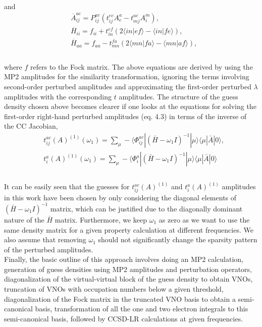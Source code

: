\\
and %
\begin{equation}
\begin{split}
& \overbar{A}^{ac}_{ij} = P_{ij}^{ac}(t^{ec}_{ij}A^a_e - t^{ac}_{mj}A^m_i) ,\\
& \overbar{H}_{ii} =  f_{ii} + t^{ef}_{in}(2 \langle in|ef \rangle - \langle in|fe \rangle),\\
& \overbar{H}_{aa} =  f_{aa} - t^{fa}_{mn}(2 \langle mn|fa \rangle - \langle mn|af \rangle), \\
\end{split}
\end{equation}
\\
where $f$ refers to the Fock matrix. The above equations are derived by 
using the MP2 amplitudes for the similarity transformation, ignoring the terms 
involving second-order perturbed amplitudes and approximating the first-order 
perturbed $\lambda$ amplitudes with the corresponding $t$ amplitudes. 
The structure of the guess density chosen above becomes clearer 
if one looks at the equations for solving the first-order right-hand perturbed amplitudes 
(eq. 4.3) in terms of the inverse of the CC Jacobian,
\\
\begin{equation}
\begin{split}
& t^{ac}_{ij}(A)^{(1)}(\omega_1) = \sum_\mu - \langle\Phi_{ij}^{ac}| {(\bar{H} -\omega_1 I)}^{-1} |
\mu\rangle\langle \mu| \bar{A} | 0\rangle, \\
& t^{a}_{i}(A)^{(1)}(\omega_1) = \sum_\mu -\langle\Phi_{i}^{a}| {(\bar{H} -\omega_1 I)}^{-1} |
\mu\rangle \langle \mu| \bar{A} | 0\rangle \\
\end{split}
\end{equation}
\\
It can be easily seen that the guesses for $t^{ac}_{ij}(A)^{(1)}$ and 
$t^{a}_{i}(A)^{(1)}$ amplitudes in this work have been chosen by 
only considering the diagonal elements of $(\bar{H} -\omega_1 I)^{-1}$
matrix, which can be justified due to the diagonally dominant nature of the
$\bar{H}$ matrix. Furthermore, we keep $\omega_1$ as zero as we 
want to use the same density matrix for a given property calculation at different
frequencies. We also assume that removing $\omega_1$ should not significantly change the 
sparsity pattern of the perturbed amplitudes. \\
Finally, the basic outline of this approach
involves doing an MP2 calculation, generation of guess densities using MP2 amplitudes and 
perturbation operators, diagonalization of the virtual-virtual block of the guess density 
to obtain VNOs, truncation of VNOs with occupation numbers below a given threshold, 
diagonalization of the Fock matrix in the truncated VNO basis to obtain a semi-canonical 
basis, transformation of all the one and two electron integrals to this semi-canonical 
basis, followed by CCSD-LR calculations at given frequencies.
